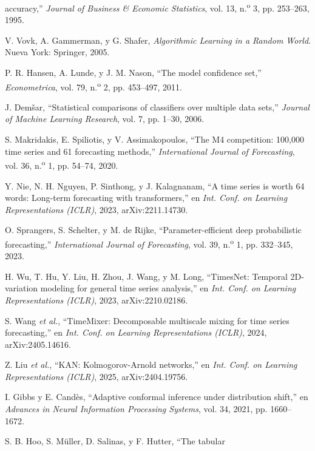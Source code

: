 \documentclass[12pt,letterpaper]{report}
\begin{document}
{\begin{enumerate}[label={[\arabic*]}, leftmargin=*, itemsep=0pt, parsep=0pt, topsep=0pt]
accuracy,'' \textit{Journal of Business \& Economic Statistics}, vol. 13,
n.\textsuperscript{o} 3, pp. 253--263, 1995.
\item\label{bib:55} V. Vovk, A. Gammerman, y G. Shafer, \textit{Algorithmic Learning
in a Random World}. Nueva York: Springer, 2005.
\item\label{bib:56} P. R. Hansen, A. Lunde, y J. M. Nason, ``The model confidence
set,'' \textit{Econometrica}, vol. 79, n.\textsuperscript{o} 2, pp. 453--497, 2011.
\item\label{bib:57} J. Dem\v{s}ar, ``Statistical comparisons of classifiers over
multiple data sets,'' \textit{Journal of Machine Learning Research}, vol. 7,
pp. 1--30, 2006.
\item\label{bib:58} S. Makridakis, E. Spiliotis, y V. Assimakopoulos, ``The M4
competition: 100,000 time series and 61 forecasting methods,'' \textit{International
Journal of Forecasting}, vol. 36, n.\textsuperscript{o} 1, pp. 54--74, 2020.
\item\label{bib:59} Y. Nie, N. H. Nguyen, P. Sinthong, y J. Kalagnanam, ``A time series is worth 64 words: Long-term forecasting with transformers,'' en \textit{Int. Conf. on Learning Representations (ICLR)}, 2023, arXiv:2211.14730.
\item\label{bib:60} O. Sprangers, S. Schelter, y M. de Rijke, ``Parameter-efficient deep probabilistic forecasting,'' \textit{International Journal of Forecasting}, vol. 39, n.\textsuperscript{o} 1, pp. 332--345, 2023.
\item\label{bib:61} H. Wu, T. Hu, Y. Liu, H. Zhou, J. Wang, y M. Long, ``TimesNet: Temporal 2D-variation modeling for general time series analysis,'' en \textit{Int. Conf. on Learning Representations (ICLR)}, 2023, arXiv:2210.02186.
\item\label{bib:62} S. Wang \textit{et al.}, ``TimeMixer: Decomposable multiscale mixing for time series forecasting,'' en \textit{Int. Conf. on Learning Representations (ICLR)}, 2024, arXiv:2405.14616.
\item\label{bib:63} Z. Liu \textit{et al.}, ``KAN: Kolmogorov-Arnold networks,'' en \textit{Int. Conf. on Learning Representations (ICLR)}, 2025, arXiv:2404.19756.
\item\label{bib:64} I. Gibbs y E. Cand\`es, ``Adaptive conformal inference under
distribution shift,'' en \textit{Advances in Neural Information Processing Systems},
vol. 34, 2021, pp. 1660--1672.
\item\label{bib:65} S. B. Hoo, S. M\"uller, D. Salinas, y F. Hutter, ``The tabular

\end{enumerate}}
\end{document}
